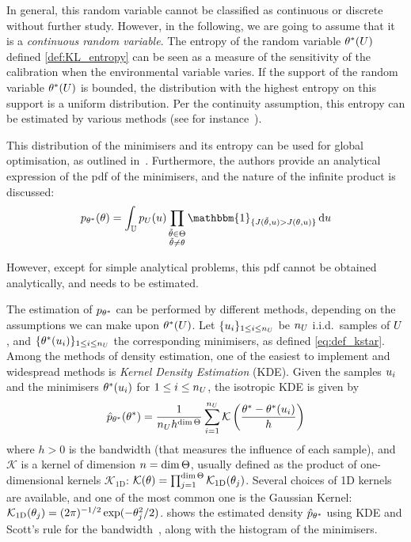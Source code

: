 \documentclass[../../Main_ManuscritThese.tex]{subfiles}
\begin{document}
In general, this random variable cannot be classified as continuous or
discrete without further study. However, in the following, we are
going to assume that it is a \emph{continuous random variable}.  The
entropy of the random variable $\theta^*(U)$ defined
\cref{def:KL_entropy} can be seen as a measure of the sensitivity of
the calibration when the environmental variable varies. If the support
of the random variable $\theta^*(U)$ is bounded, the distribution with
the highest entropy on this support is a uniform distribution.  Per
the continuity assumption, this entropy can be estimated by various
methods (see for instance~\cite{beirlant_nonparametric_1997}).


This distribution of the minimisers and its entropy can be used for
global optimisation, as outlined
in~\cite{hennig_entropy_2011}. Furthermore, the authors provide an
analytical expression of the pdf of the minimisers, and the nature of
the infinite product is discussed:
\begin{equation}
  p_{\KK^*}(\kk) = \int_{\Uspace} p_{\UU}(\uu)\prod_{\substack{\tilde{\kk}\in \Kspace\\\tilde{\kk}\neq \kk}} \mathbbm{1}_{\{J(\tilde{\kk},\uu) > J(\kk, \uu)\}}\,\mathrm{d}\uu
\end{equation}

However, except for simple analytical problems, this pdf cannot be
obtained analytically, and needs to be estimated.

The estimation of $p_{\theta^*}$ can be performed by different methods,
depending on the assumptions we can make upon $\theta^*(U)$. Let
$\{u_i\}_{1\leq i \leq n_{U}}$ be $n_{U}$ i.i.d.\ samples of
$U$, and $\{\theta^*(u_i)\}_{1\leq i \leq n_{U}}$ the corresponding
minimisers, as defined \cref{eq:def_kstar}. Among the methods of
density estimation, one of the easiest to implement and widespread
methods is \emph{Kernel Density Estimation} (KDE).  Given the samples
$u_i$ and the minimisers $\theta^*(u_i)$ for $1\leq i \leq n_{U}$,
the isotropic KDE is given by
\begin{equation}
  \hat{p}_{\theta^*}(\theta^*) = \frac{1}{n_{U} h^{\dim \Theta}} \sum_{i=1}^{n_{U}} \mathcal{K}\left(\frac{\theta^* - \theta^*(u_i)}{h}\right)
\end{equation}
where $h>0$ is the bandwidth (that measures the influence of each
sample), and $\mathcal{K}$ is a kernel of dimension $n=\dim \Theta$,
usually defined as the product of one-dimensional kernels
$\mathcal{K}_{1\mathrm{D}}$:
$\mathcal{K}(\theta) = \prod_{j=1}^{\dim
  \Theta}\mathcal{K}_{1\mathrm{D}}(\theta_j)$. Several choices of 1D
kernels are available, and one of the most common one is the Gaussian
Kernel:
$\mathcal{K}_{1\mathrm{D}}(\theta_j) = (2\pi)^{-1/2}\exp(-\theta_j^2
/2)$.  shows the estimated density
$\hat{p}_{\theta^*}$ using KDE and Scott's rule for the
bandwidth~\citep{scott_optimal_1979}, along with the histogram of the
minimisers.
\end{document}
